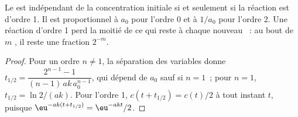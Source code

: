 \begin{proposition}\label{prop:b1:rate-laws:half-life-test}
Le  est indépendant de la concentration initiale
si et seulement si la réaction est d'ordre 1. Il est proportionnel à
$a_0$ pour l'ordre 0 et à $1/a_0$ pour l'ordre 2. Une réaction d'ordre 1
perd la moitié de ce qui reste à chaque nouveau ~:
au bout de $m$ , il reste une fraction $2^{-m}$.
\end{proposition}

\begin{proof}
Pour un ordre $n \ne 1$, la séparation des variables donne $t_{1/2} = \dfrac{2^{n-1} -
1}{(n-1)\,ak\,a_0^{n-1}}$, qui dépend de $a_0$ sauf si $n = 1$~; pour
$n = 1$, $t_{1/2} = \ln2/(ak)$. Pour l'ordre 1, $c(t + t_{1/2}) = c(t)/2$
à tout instant $t$, puisque $\eu^{-ak(t + t_{1/2})} = \eu^{-akt}/2$.
\end{proof}

